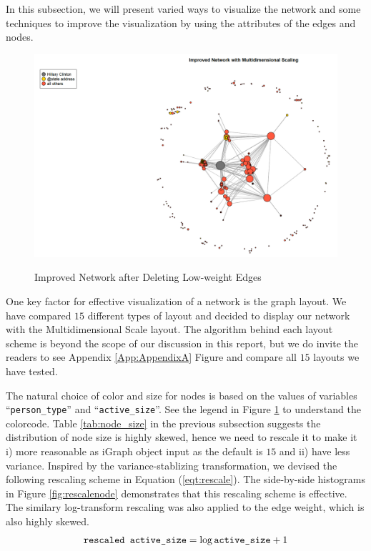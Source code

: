 In this subsection, we will present varied ways to visualize the network and some techniques to improve the visualization by using the attributes of the edges and nodes.

\begin{figure}[ht]
\centering
\includegraphics[width = 1\textwidth]{zoe/report_dms_layout}
\label{fig:improvednw}
\caption{Improved Network after Deleting Low-weight Edges}
\end{figure}

One key factor for effective visualization of a network is the graph layout. We have compared $15$ different types of layout and decided to display our network with the Multidimensional Scale layout. The algorithm behind each layout scheme is beyond the scope of our discussion in this report, but we do invite the readers to see Appendix \ref{App:AppendixA} Figure   and compare all $15$ layouts we have tested.

The natural choice of color and size for nodes is based on the values of variables ``\verb+person_type+'' and ``\verb+active_size+''. See the legend in Figure \ref{fig:improvednw} to understand the colorcode. Table \ref{tab:node_size} in the previous subsection suggests the distribution of node size is highly skewed, hence we need to rescale it to make it i) more reasonable as iGraph object input as the default is $15$ and ii) have less variance. Inspired by the variance-stablizing transformation, we devised the following rescaling scheme in Equation (\ref{eqt:rescale}). The side-by-side histograms in Figure \ref{fig:rescalenode} demonstrates that this rescaling scheme is effective. The similary log-transform rescaling was also applied to the edge weight, which is also highly skewed.
\begin{equation}
\label{eqt:rescale}
\verb+rescaled active_size+ = \log \verb+active_size+ + 1
\end{equation}

